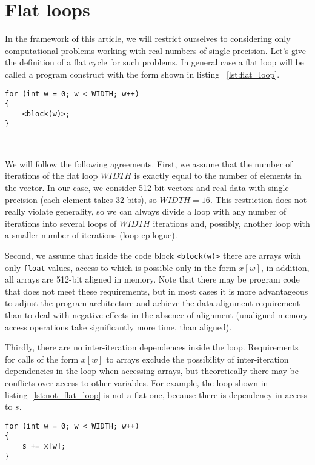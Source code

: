 \documentclass[
11pt,%
tightenlines,%
twoside,%
onecolumn,%
nofloats,%
nobibnotes,%
nofootinbib,%
superscriptaddress,%
noshowpacs,%
centertags]%
{revtex4}
\begin{document}
\section{Flat loops}

In the framework of this article, we will restrict ourselves to considering only computational problems working with real numbers of single precision.
Let's give the definition of a flat cycle for such problems.
In general case a flat loop will be called a program construct with the form shown in listing ~\ref{lst:flat_loop}.

\begin{lstlisting}[caption={General view of a flat loop.},label={lst:flat_loop}]
for (int w = 0; w < WIDTH; w++)
{
    <block(w)>;
}
\end{lstlisting}

\

We will follow the following agreements.
First, we assume that the number of iterations of the flat loop $WIDTH$ is exactly equal to the number of elements in the vector.
In our case, we consider 512-bit vectors and real data with single precision (each element takes 32 bits), so $WIDTH = 16$.
This restriction does not really violate generality, so we can always divide a loop with any number of iterations into several loops of $WIDTH$ iterations and, possibly, another loop with a smaller number of iterations (loop epilogue).

Second, we assume that inside the code block \texttt{<block(w)>} there are arrays with only \texttt{float} values, access to which is possible only in the form $x[w]$, in addition, all arrays are 512-bit aligned in memory.
Note that there may be program code that does not meet these requirements, but in most cases it is more advantageous to adjust the program architecture and achieve the data alignment requirement than to deal with negative effects in the absence of alignment (unaligned memory access operations take significantly more time, than aligned).

Thirdly, there are no inter-iteration dependences inside the loop.
Requirements for calls of the form $x[w]$ to arrays exclude the possibility of inter-iteration dependencies in the loop when accessing arrays, but theoretically there may be conflicts over access to other variables.
For example, the loop shown in listing~\ref{lst:not_flat_loop} is not a flat one, because there is dependency in access to $s$.
\begin{lstlisting}[caption={Simple example of a non-flat loop.},label={lst:not_flat_loop}]
for (int w = 0; w < WIDTH; w++)
{
    s += x[w];
}
\end{lstlisting}
\end{document}
